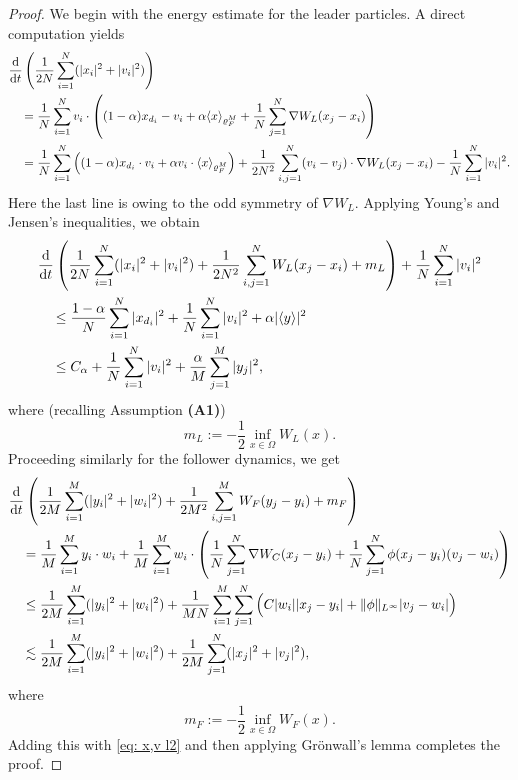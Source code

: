 \documentclass[10pt, reqno]{amsart}
\theoremstyle{definition}
\theoremstyle{remark}
\numberwithin{equation}{section}
\newcommand{\ddt}{\frac{\textnormal{d}}{\textnormal{d}t}}
\begin{document}
\begin{proof}
We begin with the energy estimate for the leader particles. A direct computation yields
    \begin{align*}
        &\ddt \left(\frac{1}{2N}\sum_{i=1}^N (|x_i|^2 + |v_i|^2) \right)\\
        &\quad = \frac{1}{N}\sum_{i=1}^N v_i \cdot \left((1-\alpha) x_{d_i} - v_i + \alpha  \langle x \rangle_{\varrho_F^M} + \frac{1}{N}\sum_{j=1}^N \nabla W_L(x_j-x_i) \right) \\
        &\quad = \frac{1}{N}\sum_{i=1}^N \Big( (1-\alpha) x_{d_i}\cdot v_i + \alpha v_i \cdot \langle x \rangle_{\varrho_F^M} \Big) + \frac{1}{2N^2}\sum_{i,j=1}^N (v_i-v_j)\cdot \nabla W_L(x_j-x_i) - \frac{1}{N}\sum_{i=1}^N |v_i|^2.
    \end{align*}
Here the last line is owing to the odd symmetry of $\nabla W_L$. Applying Young's and Jensen's inequalities, we obtain
    \begin{equation}\label{eq: x,v l2}
    \begin{split}
        &\ddt \left(\frac{1}{2N}\sum_{i=1}^N (|x_i|^2+|v_i|^2) + \frac{1}{2N^2}\sum_{i,j=1}^N W_L(x_j-x_i) + m_L \right) + \frac{1}{N}\sum_{i=1}^N |v_i|^2 \\
        &\quad \le \frac{1-\alpha}{N}\sum_{i=1}^N |x_{d_i}|^2 + \frac{1}{N}\sum_{i=1}^N |v_i|^2 + \alpha |\langle y \rangle|^2 \\
        &\quad \le C_\alpha + \frac{1}{N}\sum_{i=1}^N |v_i|^2 + \frac{\alpha}{M}\sum_{j=1}^M |y_j|^2, 
        \end{split}
    \end{equation}
    where (recalling Assumption \textbf{(A1)})
    \[
    m_L := - \frac12\inf_{x \in \Omega} W_L(x).
    \]
Proceeding similarly for the follower dynamics, we get
    \begin{align*}
        &\ddt \left(\frac{1}{2M}\sum_{i=1}^M (|y_i|^2 + |w_i|^2)  + \frac{1}{2M^2}\sum_{i,j=1}^M W_F(y_j-y_i) + m_F \right)\\
        &\quad = \frac{1}{M}\sum_{i=1}^M y_i\cdot w_i + \frac{1}{M}\sum_{i=1}^M w_i \cdot \left( \frac{1}{N}\sum_{j=1}^N \nabla W_C(x_j-y_i) + \frac{1}{N}\sum_{j=1}^N \phi(x_j-y_i)(v_j-w_i) \right) \\
        &\quad \le \frac{1}{2M}\sum_{i=1}^M (|y_i|^2 + |w_i|^2) + \frac{1}{MN}\sum_{i=1}^M \sum_{j=1}^N \Big( C|w_i| |x_j-y_i| + \|\phi\|_{L^\infty}|v_j-w_i| \Big)\\
        &\quad \lesssim \frac{1}{2M}\sum_{i=1}^M (|y_i|^2 + |w_i|^2 ) + \frac{1}{2M}\sum_{j=1}^N (|x_j|^2 + |v_j|^2), 
    \end{align*}
    where
    \[
    m_F := - \frac12\inf_{x \in \Omega} W_F(x).
    \]
    Adding this with \eqref{eq: x,v l2} and then applying Gr\"onwall's lemma completes the proof.
\end{proof}
\end{document}
